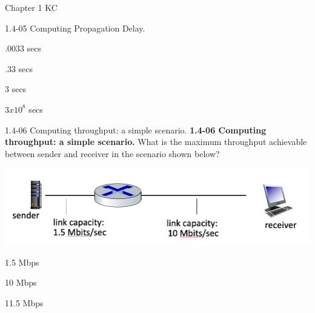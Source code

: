 \documentclass[a4paper]{article}
\begin{document}
\begin{quiz}{Chapter 1 KC}
\begin{multi}[points=1]{1.4-05 Computing Propagation Delay.}
\item* .0033 secs
\item .33 secs
\item 3 secs
\item $3 x 10^8$ secs
\end{multi}

\begin{multi}[points=1]{1.4-06 Computing throughput: a simple scenario.}
\textbf{1.4-06 Computing throughput: a simple scenario.} 
What is the maximum throughput achievable between sender and receiver in the scenario shown below? 
\begin{center}
\includegraphics[width=\linewidth]{figs/1.4.6.jpg}
\end{center}
  
\item* 1.5 Mbps
\item 10 Mbps
\item 11.5 Mbps
\end{multi}


\end{quiz}
\end{document}
